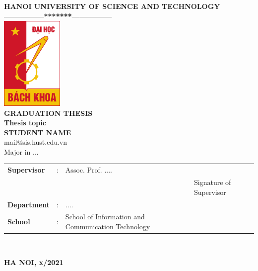 \thispagestyle{empty}
%
\begin{center}

{
{\fontsize{14}{12}\selectfont \textbf{HANOI UNIVERSITY OF SCIENCE AND TECHNOLOGY}}\\
\textbf{---------------*******---------------}\\[1cm]
\includegraphics[width=3cm]{Figures/bklogo.jpg}
\centering
\\[1cm]
{\fontsize{25}{43}\selectfont \textbf{GRADUATION THESIS}}\\[0.3cm]
{\fontsize{22}{30}\selectfont \textbf{Thesis topic}}\\[0.3cm]
{\fontsize{14}{20}\selectfont \textbf{STUDENT NAME} \\
\fontsize{13}{18}\selectfont mail@sis.hust.edu.vn}\\[0.3cm]

{\fontsize{17}{10}\selectfont Major in ...}\\[1.5cm]

\vspace*{1\baselineskip}  
\begin{tabular}{l c l l}
  \textbf{Supervisor} & : &  Assoc. Prof. .... & \text{\_\_\_\_\_\_\_\_\_\_\_\_\_\_\_\_\_\_\_\_} \\
  & & & \fontsize{10}{10}\selectfont Signature of Supervisor\\
  \textbf{Department} & : &  .... \\
  \textbf{School} & : &  School of Information and Communication Technology \\
\end{tabular} \\[3cm]
}

\vspace*{1\baselineskip}  
\fontsize{15}{19}\selectfont \textbf{HA NOI, x/2021}
\end{center}
\pagebreak